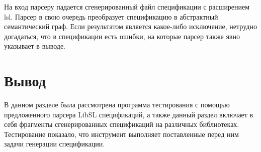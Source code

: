 На вход парсеру падается сгенерированный файл спецификации с расширением lsl. Парсер в свою очередь преобразует спецификацию в абстрактный семантический граф.
Если результатом является какое-либо исключение, нетрудно догадаться, что в спецификации есть ошибки, на которые парсер также явно указывает в выводе.

\section{Вывод}

В данном разделе была рассмотрена программа тестирования с помощью предложенного парсера LibSL спецификаций, а также данный раздел включает в себя фрагменты сгенерированных спецификаций на различных библиотеках.
Тестирование показало, что инструмент выполняет поставленные перед ним задачи генерации спецификации.

